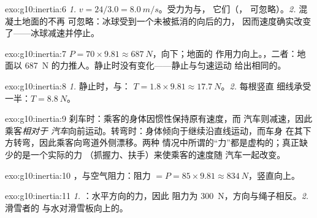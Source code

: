 \begin{solution}{exo:g10:inertia:6}
\emph{1.} $v = 24/3.0 = \qty{8.0}{m/s}$。受力为与，
它们（，
可忽略）。\emph{2.} 混凝土地面的不再
可忽略：冰球受到一个未被抵消的向后的力，
因而速度确实改变了——冰球减速并停止。
\end{solution}

\begin{solution}{exo:g10:inertia:7}
 $P = 70 \times 9.81 \approx \qty{687}{N}$，向下；地面的
作用力向上。，二者：地面以
\qty{687}{N} 的力推人。静止时没有变化——静止与匀速运动
给出相同的。
\end{solution}

\begin{solution}{exo:g10:inertia:8}
\emph{1.} 静止时，与：
$T = 1.8 \times 9.81 \approx \qty{17.7}{N}$。\emph{2.} 每根竖直
细线承受一半：$T = \qty{8.8}{N}$。
\end{solution}

\begin{solution}{exo:g10:inertia:9}
刹车时：乘客的身体因惯性保持原有速度，而
汽车则减速，因此乘客\emph{相对于
汽车}向前运动。转弯时：身体倾向于继续沿直线运动，而车身
在其下方转弯，因此乘客向弯道外侧漂移。两种
情况中所谓的“力”都是虚构的；真正缺少的是一个实际的力
（抓握力、扶手）来使乘客的速度随
汽车一起改变。
\end{solution}

\begin{solution}{exo:g10:inertia:10}
，与空气阻力：阻力
$= P = 85 \times 9.81 \approx \qty{834}{N}$，竖直向上。
\end{solution}

\begin{solution}{exo:g10:inertia:11}
\emph{1.} ：水平方向的力，因此
阻力为 \qty{300}{N}，方向与绳子相反。\emph{2.} 滑雪者的
与水对滑雪板向上的。
\end{solution}

